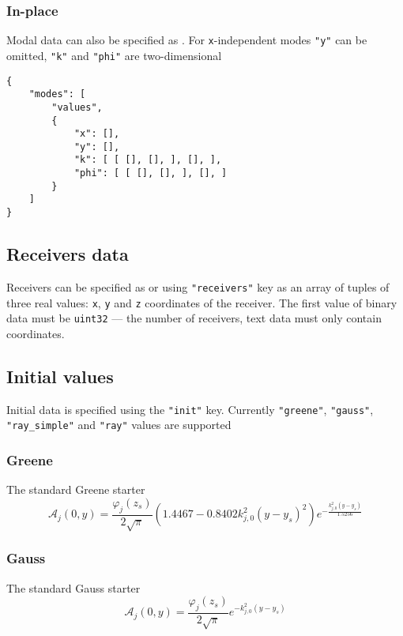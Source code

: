 \documentclass[12pt]{extarticle}
\newcommand{\code}[1]{\colorbox{gray!10}{\texttt{#1}}}
\begin{document}
            \subsubsection{In-place}
                \par Modal data can also be specified as . For \code{x}-independent modes \code{"y"} can be omitted, \code{"k"} and \code{"phi"} are two-dimensional
                \begin{verbatim}
{
    "modes": [
        "values",
        {
            "x": [],
            "y": [],
            "k": [ [ [], [], ], [], ],
            "phi": [ [ [], [], ], [], ]
        }
    ]
}
                \end{verbatim}
        \subsection{Receivers data}
            \par Receivers can be specified as  or  using \code{"receivers"} key as an array of tuples of three real values: \code{x}, \code{y} and \code{z} coordinates of the receiver. The first value of binary data must be \code{uint32} --- the number of receivers, text data must only contain coordinates.
        \subsection{Initial values}
            \par Initial data is specified using the \code{"init"} key. Currently \code{"greene"}, \code{"gauss"}, \code{"ray_simple"} and \code{"ray"} values are supported
            \subsubsection{Greene}
                \par The standard Greene starter
                \begin{equation*}
                    \mathcal{A}_j\left(0, y\right)=\frac{\varphi_j\left(z_s\right)}{2\sqrt{\pi}}\left(1.4467-0.8402k_{j,0}^2\left(y-y_s\right)^2\right)e^{-\frac{k_{j,0}^2\left(y-y_s\right)}{1.5256}}
                \end{equation*}
            \subsubsection{Gauss}
                \par The standard Gauss starter
                \begin{equation*}
                    \mathcal{A}_j\left(0, y\right)=\frac{\varphi_j\left(z_s\right)}{2\sqrt{\pi}}e^{-k_{j,0}^2\left(y-y_s\right)}
                \end{equation*}
\end{document}
